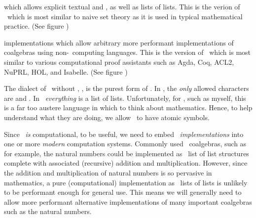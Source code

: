 \item {} which allows explicit textual  
and , as well as lists of lists. This is the verion 
of \joylol\ which is most similar to naive set theory as it is used in 
typical mathematical practice. (See figure ) 

\item {} implementations which allow arbitrary 
more performant implementations of coalgebras using non-\joylol\ computing 
languages. This is the version of \joylol\ which is most similar to 
various computational proof assistants such as Agda, Coq, ACL2, NuPRL, 
HOL, and Isabelle. (See figure ) 

\stopitemize 

The dialect of \joylol\ without , \joylolZero, is the 
purest form of \joylol. In \joylolZero, the \emph{only} allowed characters 
are \quote{(} and \quote{)}. In \joylolZero\ \emph{everything} is a list 
of lists. Unfortunately, for , such as 
myself, this is a far too austere language in which to think about 
mathematics. Hence, to help  understand what 
they are doing, we allow \joylol\ to have atomic symbols. 

Since \joylol\ \emph{is} computational, to be useful, we need to embed 
\joylol\ \emph{implementations} into one or more \emph{modern} computation 
systems. Commonly used \joylol\ coalgebras, such as for example, the 
natural numbers could be implemented as \joylolZero\ list of list 
structures complete with associated (recursive) addition and 
multiplication. However, since the addition and multiplication of natural 
numbers is so pervasive in mathematics, a pure (computational) 
implementation as \joylolZero\ lists of lists is unlikely to be performant 
enough for general use. This means we will generally need to allow more 
performant alternative implementations of many important coalgebras such 
as the natural numbers. 

